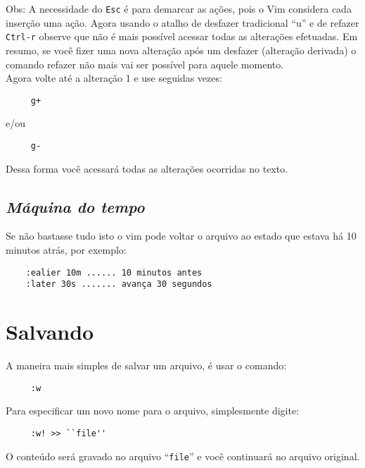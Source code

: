 Obs: A necessidade do {\tt Esc} é para demarcar as ações, pois o Vim
considera cada inserção uma ação.  Agora usando o atalho de desfazer
tradicional ``u'' e de refazer {\tt Ctrl-r} observe que não é mais possível
acessar todas as alterações efetuadas. Em resumo, se você fizer uma
nova alteração após um desfazer (alteração derivada) o comando refazer
não mais vai ser possível para aquele momento. \\

Agora volte até a alteração 1 e use seguidas vezes:

\begin{verbatim}
     g+
\end{verbatim}

e/ou

\begin{verbatim}
     g-
\end{verbatim}

Dessa forma você acessará todas as alterações ocorridas no texto.


\subsection{{\em Máquina do tempo}}
\label{Maquina do tempo}

Se não bastasse tudo isto o vim pode voltar o arquivo ao estado 
que estava há 10 minutos atrás, por exemplo:

\begin{verbatim}
    :ealier 10m ...... 10 minutos antes
    :later 30s ....... avança 30 segundos
\end{verbatim}

\section{Salvando}
\label{sec:Salvando}

A maneira mais simples de salvar um arquivo, é usar o comando:

\begin{verbatim}
     :w
\end{verbatim}


Para especificar um novo nome para o arquivo, simplesmente digite:

\begin{verbatim}
     :w! >> ``file''
\end{verbatim}

O conteúdo será gravado no arquivo ``{\tt file}'' e você continuará no arquivo original.

